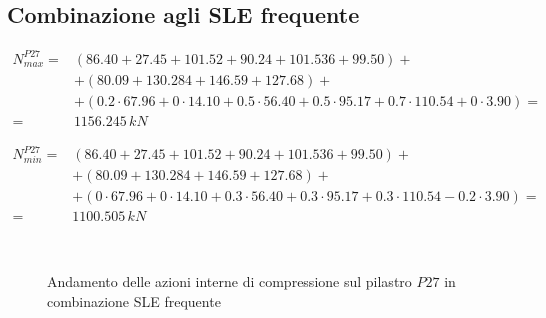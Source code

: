 \subsection{Combinazione agli SLE frequente}

\begin{align*}
	N_{max}^{P27} =& (86.40+27.45+101.52+90.24+101.536+99.50)+\\
	&+(80.09+130.284+146.59+127.68)+\\	&+(0.2\cdot67.96+0\cdot14.10+0.5\cdot56.40+0.5\cdot95.17+0.7\cdot110.54+0\cdot3.90) =\\
	=& 1156.245\,kN
\end{align*}

\begin{align*}
	N_{min}^{P27} =& (86.40+27.45+101.52+90.24+101.536+99.50)+\\
	&+(80.09+130.284+146.59+127.68)+\\	&+(0\cdot67.96+0\cdot14.10+0.3\cdot56.40+0.3\cdot95.17+0.3\cdot110.54-0.2\cdot3.90) =\\
	=& 1100.505\,kN
\end{align*}

\begin{figure}
	\centering
	\\
	\caption{Andamento delle azioni interne di compressione sul pilastro $P27$ in combinazione SLE frequente}
	\label{fig:P27axialLoad_sleFreq}
\end{figure}

